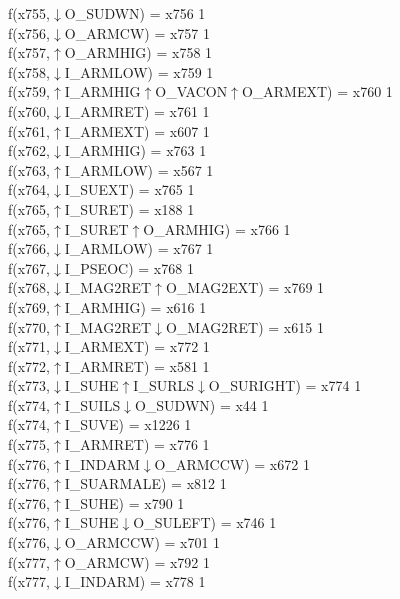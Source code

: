 f(x755,$\downarrow$O\_SUDWN) = x756 {1} \\
f(x756,$\downarrow$O\_ARMCW) = x757 {1} \\
f(x757,$\uparrow$O\_ARMHIG) = x758 {1} \\
f(x758,$\downarrow$I\_ARMLOW) = x759 {1} \\
f(x759,$\uparrow$I\_ARMHIG$\uparrow$O\_VACON$\uparrow$O\_ARMEXT) = x760 {1} \\
f(x760,$\downarrow$I\_ARMRET) = x761 {1} \\
f(x761,$\uparrow$I\_ARMEXT) = x607 {1} \\
f(x762,$\downarrow$I\_ARMHIG) = x763 {1} \\
f(x763,$\uparrow$I\_ARMLOW) = x567 {1} \\
f(x764,$\downarrow$I\_SUEXT) = x765 {1} \\
f(x765,$\uparrow$I\_SURET) = x188 {1} \\
f(x765,$\uparrow$I\_SURET$\uparrow$O\_ARMHIG) = x766 {1} \\
f(x766,$\downarrow$I\_ARMLOW) = x767 {1} \\
f(x767,$\downarrow$I\_PSEOC) = x768 {1} \\
f(x768,$\downarrow$I\_MAG2RET$\uparrow$O\_MAG2EXT) = x769 {1} \\
f(x769,$\uparrow$I\_ARMHIG) = x616 {1} \\
f(x770,$\uparrow$I\_MAG2RET$\downarrow$O\_MAG2RET) = x615 {1} \\
f(x771,$\downarrow$I\_ARMEXT) = x772 {1} \\
f(x772,$\uparrow$I\_ARMRET) = x581 {1} \\
f(x773,$\downarrow$I\_SUHE$\uparrow$I\_SURLS$\downarrow$O\_SURIGHT) = x774 {1} \\
f(x774,$\uparrow$I\_SUILS$\downarrow$O\_SUDWN) = x44 {1} \\
f(x774,$\uparrow$I\_SUVE) = x1226 {1} \\
f(x775,$\uparrow$I\_ARMRET) = x776 {1} \\
f(x776,$\uparrow$I\_INDARM$\downarrow$O\_ARMCCW) = x672 {1} \\
f(x776,$\uparrow$I\_SUARMALE) = x812 {1} \\
f(x776,$\uparrow$I\_SUHE) = x790 {1} \\
f(x776,$\uparrow$I\_SUHE$\downarrow$O\_SULEFT) = x746 {1} \\
f(x776,$\downarrow$O\_ARMCCW) = x701 {1} \\
f(x777,$\uparrow$O\_ARMCW) = x792 {1} \\
f(x777,$\downarrow$I\_INDARM) = x778 {1} \\
